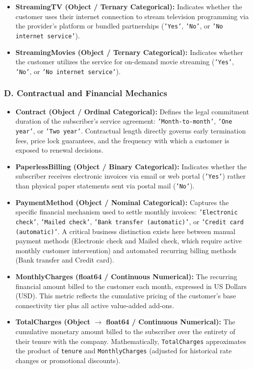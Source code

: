 \begin{itemize}
    \item \textbf{StreamingTV (Object / Ternary Categorical):} Indicates whether the customer uses their internet connection to stream television programming via the provider's platform or bundled partnerships (\texttt{'Yes'}, \texttt{'No'}, or \texttt{'No internet service'}).
    \item \textbf{StreamingMovies (Object / Ternary Categorical):} Indicates whether the customer utilizes the service for on-demand movie streaming (\texttt{'Yes'}, \texttt{'No'}, or \texttt{'No internet service'}).
\end{itemize}

\subsubsection{D. Contractual and Financial Mechanics}
\begin{itemize}
    \item \textbf{Contract (Object / Ordinal Categorical):} Defines the legal commitment duration of the subscriber's service agreement: \texttt{'Month-to-month'}, \texttt{'One year'}, or \texttt{'Two year'}. Contractual length directly governs early termination fees, price lock guarantees, and the frequency with which a customer is exposed to renewal decisions.
    \item \textbf{PaperlessBilling (Object / Binary Categorical):} Indicates whether the subscriber receives electronic invoices via email or web portal (\texttt{'Yes'}) rather than physical paper statements sent via postal mail (\texttt{'No'}).
    \item \textbf{PaymentMethod (Object / Nominal Categorical):} Captures the specific financial mechanism used to settle monthly invoices: \texttt{'Electronic check'}, \texttt{'Mailed check'}, \texttt{'Bank transfer (automatic)'}, or \texttt{'Credit card (automatic)'}. A critical business distinction exists here between manual payment methods (Electronic check and Mailed check, which require active monthly customer intervention) and automated recurring billing methods (Bank transfer and Credit card).
    \item \textbf{MonthlyCharges (float64 / Continuous Numerical):} The recurring financial amount billed to the customer each month, expressed in US Dollars (USD). This metric reflects the cumulative pricing of the customer's base connectivity tier plus all active value-added add-ons.
    \item \textbf{TotalCharges (Object $\rightarrow$ float64 / Continuous Numerical):} The cumulative monetary amount billed to the subscriber over the entirety of their tenure with the company. Mathematically, \texttt{TotalCharges} approximates the product of \texttt{tenure} and \texttt{MonthlyCharges} (adjusted for historical rate changes or promotional discounts).
\end{itemize}

